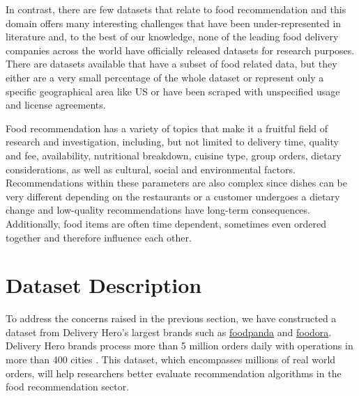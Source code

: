 \documentclass[manuscript]{acmart}
\begin{document}
In contrast, there are few datasets that relate to food recommendation
and this domain offers many interesting challenges that have been
under-represented in literature and, to the best of our knowledge, none
of the leading food delivery companies across the world have officially
released datasets for research purposes. There are datasets available
that have a subset of food related data, but they either are a very small
percentage of the whole dataset \cite{ecommerce} or represent only a
specific geographical area like US \cite{yelp} or have been
scraped \cite{zomato,grubhub} with unspecified usage and license agreements. 

Food recommendation has a variety of topics that make it a fruitful field
of research and investigation, including, but not limited to delivery
time, quality and fee, availability, nutritional breakdown, cuisine type,
group orders, dietary considerations, as well as cultural, social and
environmental factors.  Recommendations within these parameters are also
complex since dishes can be very different depending on the restaurants
or a customer undergoes a dietary change and low-quality recommendations
have long-term consequences.  Additionally, food items are often time
dependent, sometimes even ordered together and therefore influence each
other.



\section{Dataset Description}
\label{sec:dataset}
To address the concerns raised in the previous section, we have
constructed a dataset from Delivery Hero’s largest brands such as
\href{https://www.foodpanda.com/about-foodpanda/}{foodpanda} and
\href{https://www.foodora.com/about/}{foodora}.
Delivery Hero brands process more than 5 million orders daily
with operations in more than 400 cities \cite{foodpanda_info}. This
dataset, which encompasses millions of real world orders, will help
researchers better evaluate recommendation algorithms in the food
recommendation sector. 
\end{document}
